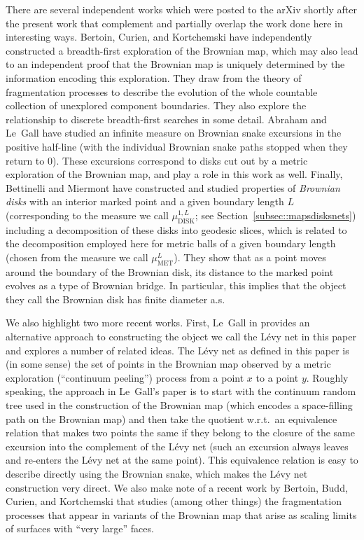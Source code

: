 \documentclass[JEP,XML,SOM,Unicode]{cedram}
\theoremstyle{plain}
\numberwithin{theorem}{section}
\theoremstyle{definition}
\newcommand{\mudonel}{\mu_{ \mathrm{DISK}}^{1, L}}
\newcommand{\muml}{\mu_{\mathrm{MET}}^L}
\begin{document}
There are several independent works which were posted to the arXiv shortly after the present work that complement and partially overlap the work done here in interesting ways. Bertoin, Curien, and Kortchemski \cite{bck} have independently constructed a breadth-first exploration of the Brownian map, which may also lead to an independent proof that the Brownian map is uniquely determined by the information encoding this exploration. They draw from the theory of fragmentation processes to describe the evolution of the whole countable collection of unexplored component boundaries. They also explore the relationship to discrete breadth-first searches in some detail. Abraham and Le~Gall \cite{alg} have studied an infinite measure on Brownian snake excursions in the positive half-line (with the individual Brownian snake paths stopped when they return to $0$). These excursions correspond to disks cut out by a metric exploration of the Brownian map, and play a role in this work as well. Finally, Bettinelli and Miermont \cite{bettinelli_miermont_disks} have constructed and studied properties of \emph{Brownian disks} with an interior marked point and a given boundary length $L$ (corresponding to the measure we call $\mudonel$; see Section~\ref{subsec::mapsdisksnets}) including a decomposition of these disks into geodesic slices, which is related to the decomposition employed here for metric balls of a given boundary length (chosen from the measure we call $\muml$). They show that as a point moves around the boundary of the Brownian disk, its distance to the marked point evolves as a type of Brownian bridge. In particular, this implies that the object they call the Brownian disk has finite diameter a.s.

We also highlight two more recent works. First, Le~Gall in \cite{legallsubordination} provides an alternative approach to constructing the object we call the Lévy net in this paper and explores a number of related ideas. The Lévy net as defined in this paper is (in some sense) the set of points in the Brownian map observed by a metric exploration (``continuum peeling'') process from a point $x$ to a point $y$. Roughly speaking, the approach in Le~Gall's paper is to start with the continuum random tree used in the construction of the Brownian map (which encodes a space-filling path on the Brownian map) and then take the quotient w.r.t.\ an equivalence relation that makes two points the same if they belong to the closure of the same excursion into the complement of the Lévy net (such an excursion always leaves and re-enters the Lévy net at the same point). This equivalence relation is easy to describe directly using the Brownian snake, which makes the Lévy net construction very direct. We also make note of a recent work by Bertoin, Budd, Curien, and Kortchemski \cite{betroinbuddcurienkortchemski} that studies (among other things) the fragmentation processes that appear in variants of the Brownian map that arise as scaling limits of surfaces with ``very large'' faces.
\end{document}
